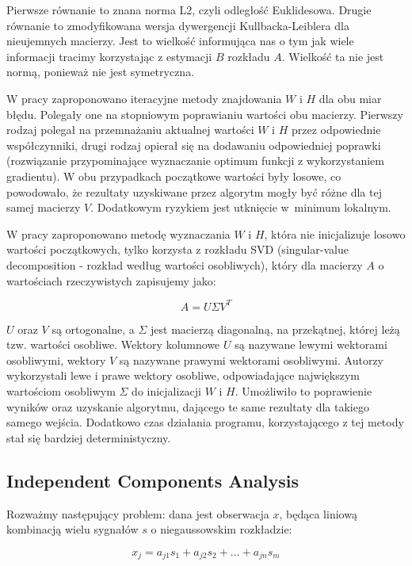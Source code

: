 \documentclass[oneside, eng]{mgr}
\begin{document}
Pierwsze równanie to znana norma L2, czyli odległość Euklidesowa. Drugie równanie to zmodyfikowana wersja dywergencji Kullbacka-Leiblera dla nieujemnych macierzy. Jest to wielkość informująca nas o tym jak wiele informacji tracimy korzystając z estymacji $B$ rozkładu $A$. Wielkość ta nie jest normą, ponieważ nie jest symetryczna.

W pracy \cite{NMF} zaproponowano iteracyjne metody znajdowania $W$ i $H$ dla obu miar błędu. Polegały one na stopniowym poprawianiu wartości obu macierzy. Pierwszy rodzaj polegał na przemnażaniu aktualnej wartości $W$ i $H$ przez odpowiednie współczynniki, drugi rodzaj opierał się na dodawaniu odpowiedniej poprawki (rozwiązanie przypominające wyznaczanie optimum funkcji z wykorzystaniem gradientu). W obu przypadkach początkowe wartości były losowe, co powodowało, że rezultaty uzyskiwane przez algorytm mogły być różne dla tej samej macierzy $V$. Dodatkowym ryzykiem jest utknięcie w~minimum lokalnym.

W pracy \cite{NMF_SVD} zaproponowano metodę wyznaczania $W$ i $H$, która nie inicjalizuje losowo wartości początkowych, tylko korzysta z rozkładu SVD (singular-value decomposition - rozkład według wartości osobliwych), który dla macierzy $A$ o wartościach rzeczywistych zapisujemy jako:

\begin{equation}
	A = U \Sigma V^T
\end{equation}

$U$ oraz $V$ są ortogonalne, a $\Sigma$ jest macierzą diagonalną, na przekątnej, której leżą tzw. wartości osobliwe. Wektory kolumnowe $U$ są nazywane lewymi wektorami osobliwymi, wektory $V$ są nazywane prawymi wektorami osobliwymi. Autorzy \cite{NMF_SVD} wykorzystali lewe i prawe wektory osobliwe, odpowiadające największym wartościom osobliwym $\Sigma$ do inicjalizacji $W$ i $H$. Umożliwiło to poprawienie wyników oraz uzyskanie algorytmu, dającego te same rezultaty dla takiego samego wejścia. Dodatkowo czas działania programu, korzystającego z tej metody stał się bardziej deterministyczny.

\subsection{Independent Components Analysis}

Rozważmy następujący problem: dana jest obserwacja $x$, będąca liniową kombinacją wielu sygnałów $s$ o niegaussowskim rozkładzie:

\begin{equation}
	x_j = a_{j1} s_1 + a_{j2} s_2 + ... + a_{jn} s_m
\end{equation}
\end{document}

